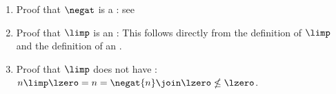 \begin{proofns}
\begin{enumerate}
  \item Proof that $\negat$ is a : see 
  \item Proof that $\limp$ is an : 
        This follows directly from the definition of $\limp$ and the definition of an  .
  \item Proof that $\limp$ does not have : $n\limp\lzero=n=\negat{n}\join\lzero\nleq\lzero$.
\end{enumerate}
\end{proofns}

